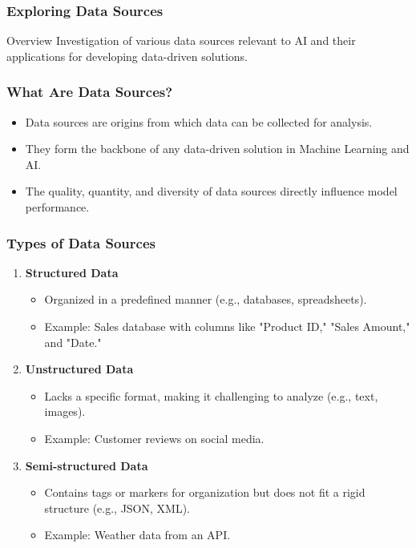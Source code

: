 \documentclass[aspectratio=169]{beamer}
\begin{document}
\begin{frame}[fragile]
    \frametitle{Exploring Data Sources}
    \begin{block}{Overview}
        Investigation of various data sources relevant to AI and their applications for developing data-driven solutions.
    \end{block}
\end{frame}

\begin{frame}[fragile]
    \frametitle{What Are Data Sources?}
    \begin{itemize}
        \item Data sources are origins from which data can be collected for analysis.
        \item They form the backbone of any data-driven solution in Machine Learning and AI.
        \item The quality, quantity, and diversity of data sources directly influence model performance.
    \end{itemize}
\end{frame}

\begin{frame}[fragile]
    \frametitle{Types of Data Sources}
    \begin{enumerate}
        \item \textbf{Structured Data}
            \begin{itemize}
                \item Organized in a predefined manner (e.g., databases, spreadsheets).
                \item Example: Sales database with columns like "Product ID," "Sales Amount," and "Date."
            \end{itemize}
        \item \textbf{Unstructured Data}
            \begin{itemize}
                \item Lacks a specific format, making it challenging to analyze (e.g., text, images).
                \item Example: Customer reviews on social media.
            \end{itemize}
        \item \textbf{Semi-structured Data}
            \begin{itemize}
                \item Contains tags or markers for organization but does not fit a rigid structure (e.g., JSON, XML).
                \item Example: Weather data from an API.
            \end{itemize}
    \end{enumerate}
\end{frame}
\end{document}
